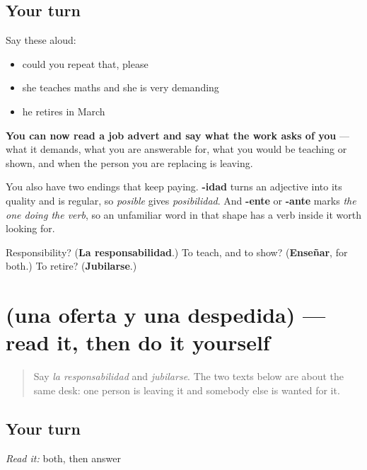 \subsection*{Your turn}
Say these aloud:

\begin{itemize}
\raggedright
  \item could you repeat that, please
  \item she teaches maths and she is very demanding
  \item he retires in March
\end{itemize}

\begin{grammarlens}[title={What you've built}]
\textbf{You can now read a job advert and say what the work asks of you} — what it demands, what you are answerable for, what you would be teaching or shown, and when the person you are replacing is leaving.

You also have two endings that keep paying. \textbf{-idad} turns an adjective into its quality and is regular, so \emph{posible} gives \emph{posibilidad}. And \textbf{-ente} or \textbf{-ante} marks \emph{the one doing the verb}, so an unfamiliar word in that shape has a verb inside it worth looking for.
\end{grammarlens}

\begin{tcolorbox}[breakable,colback=teal!4,colframe=teal!35!black,title={Before you move on}]
Responsibility? (\textbf{La responsabilidad}.) To teach, and to show? (\textbf{Enseñar}, for both.) To retire? (\textbf{Jubilarse}.)
\end{tcolorbox}
\section[Practice]{(una oferta y una despedida) — read it, then do it yourself}

\label{lesson:ES-C445-sintesis-puesto}



\begin{quote}
Say \emph{la responsabilidad} and \emph{jubilarse}. The two texts below are about the same desk: one person is leaving it and somebody else is wanted for it.
\end{quote}

\subsection*{Your turn}
\emph{Read it:} both, then answer

